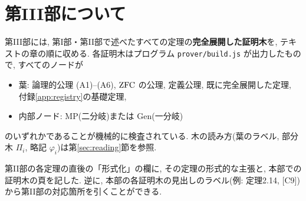 \chapter*{第III部について}

第III部には, 第I部・第II部で述べたすべての定理の\textbf{完全展開した証明木}を, テキストの章の順に収める.
各証明木はプログラム \texttt{prover/build.js} が出力したもので, すべてのノードが
\begin{itemize}
  \item 葉: 論理的公理 (A1)--(A6), $\mathrm{ZFC}$ の公理, 定義公理, 既に完全展開した定理, 付録\ref{app:registry}の基礎定理,
  \item 内部ノード: MP(二分岐)または Gen(一分岐)
\end{itemize}
のいずれかであることが機械的に検査されている. 木の読み方(葉のラベル, 部分木 $\Pi_i$, 略記 $\varphi_i$)は第\ref{sec:reading}節を参照.

第II部の各定理の直後の「形式化」の欄に, その定理の形式的な主張と, 本部での証明木の頁を記した. 逆に, 本部の各証明木の見出しのラベル(例: 定理2.14, [C9])から第II部の対応箇所を引くことができる.


